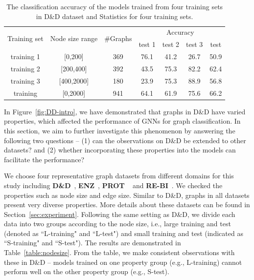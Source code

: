 \documentclass[11pt,dvipdfm]{article}
\begin{document}
\begin{table}[h]
\begin{center}
\begin{minipage}{\textwidth}
\caption{The classification accuracy of the models trained from four training sets in D\&D dataset and  Statistics for four training sets.}\label{tab:ac_on_diff_test}
\begin{tabular*}{\textwidth}{@{\extracolsep{\fill}}ccccccc@{\extracolsep{\fill}}}
\toprule%
\multirow{2}{*}{Training set} & \multirow{2}{*}{Node size range} & \multirow{2}{*}{\#Graphs}  &
\multicolumn{4}{c}{Accuracy} \\ \cline{4-7} 

    &             &        & test 1 & test 2  & test 3 & test \\
\midrule
training 1  &[0,200]  & 369        & 76.1            & 41.2      & 26.7      & 50.9     \\ 
training 2  &[200,400]  & 392          & 43.5            &75.3      & 82.2      & 62.4   \\ 
training 3   &[400,2000]  & 180       &23.9           & 75.3       & 88.9      & 56.8  \\ 
training     &[0,2000]  & 941        & 64.1            & 61.9      & 75.6      & 66.2  \\
\bottomrule
\end{tabular*}

\end{minipage}
\end{center}
\end{table}


In Figure~\ref{fig:DD-intro}, we have demonstrated that graphs in D\&D have varied properties, which affected the performance of GNNs for graph classification. In this section, we aim to further investigate this phenomenon by answering the following two questions -- (1) can the observations on D\&D be extended to other datasets? and (2) whether incorporating these properties into the models can facilitate the performance?

We choose four representative graph datasets from different domains for this study including \textbf{D\&D}~\cite{dobson2003distinguishing}, \textbf{ENZ}~\cite{shervashidze2011weisfeiler}, \textbf{PROT} ~\cite{borgwardt2005protein} and \textbf{RE-BI}~\cite{yanardag2015deep}.
We checked the properties such as node size and edge size. Similar to D\&D, graphs in all datasets present very diverse properties. More details about these datasets can be found in Section~\ref{sec:experiment}.
Following the same setting as D\&D, we divide each data into two groups according to the node size, i.e., large training and test (denoted as ``L-training" and ``L-test") and small training and test (indicated as ``S-training" and ``S-test"). 
The results are demonstrated in Table~\ref{table:nodesize}. 
From the table, we make consistent observations with these in D\&D -- models trained on one property group (e.g., L-training) cannot perform well on the other property group (e.g., S-test). 
\end{document}
